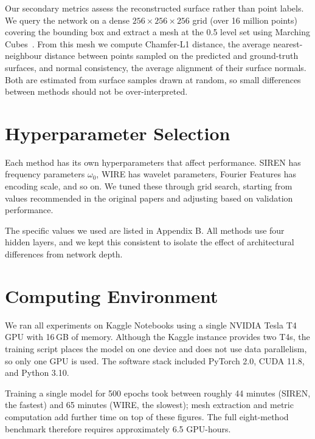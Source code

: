 Our secondary metrics assess the reconstructed surface rather than point labels. We query the network on a dense $256 \times 256 \times 256$ grid (over 16 million points) covering the bounding box and extract a mesh at the 0.5 level set using Marching Cubes~\cite{lorensen1987marching}. From this mesh we compute Chamfer-L1 distance, the average nearest-neighbour distance between points sampled on the predicted and ground-truth surfaces, and normal consistency, the average alignment of their surface normals. Both are estimated from surface samples drawn at random, so small differences between methods should not be over-interpreted.

\section{Hyperparameter Selection}

Each method has its own hyperparameters that affect performance. SIREN has frequency parameters $\omega_0$, WIRE has wavelet parameters, Fourier Features has encoding scale, and so on. We tuned these through grid search, starting from values recommended in the original papers and adjusting based on validation performance.

The specific values we used are listed in Appendix B. All methods use four hidden layers, and we kept this consistent to isolate the effect of architectural differences from network depth.

\section{Computing Environment}

We ran all experiments on Kaggle Notebooks using a single NVIDIA Tesla T4 GPU with 16\,GB of memory. Although the Kaggle instance provides two T4s, the training script places the model on one device and does not use data parallelism, so only one GPU is used. The software stack included PyTorch 2.0, CUDA 11.8, and Python 3.10.

Training a single model for 500 epochs took between roughly 44 minutes (SIREN, the fastest) and 65 minutes (WIRE, the slowest); mesh extraction and metric computation add further time on top of these figures. The full eight-method benchmark therefore requires approximately 6.5 GPU-hours.
